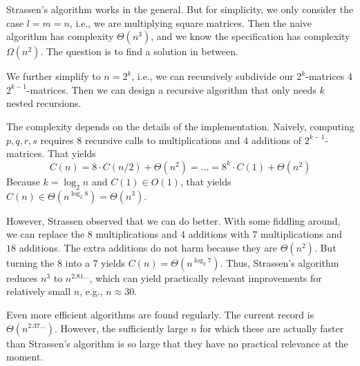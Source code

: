 Strassen's algorithm works in the general.
But for simplicity, we only consider the case $l=m=n$, i.e., we are multiplying square matrices.
Then the naive algorithm has complexity $\Theta(n^3)$, and we know the specification has complexity $\Omega(n^2)$.
The question is to find a solution in between.

We further simplify to $n=2^k$, i.e., we can recursively subdivide our $2^k$-matrices $4$ $2^{k-1}$-matrices.
Then we can design a recursive algorithm that only needs $k$ nested recursions.

The complexity depends on the details of the implementation.
Naively, computing $p,q,r,s$ requires $8$ recursive calls to multiplications and $4$ additions of $2^{k-1}$-matrices.
That yields
 \[C(n)=8\cdot C(n/2) + \Theta(n^2) = \ldots = 8^k\cdot C(1)+\Theta(n^2)\]
Because $k=\log_2 n$ and $C(1)\in O(1)$, that yields $C(n)\in\Theta(n^{\log_2 8})=\Theta(n^3)$.

However, Strassen observed that we can do better.
With some fiddling around, we can replace the $8$ multiplications and $4$ additions with $7$ multiplications and $18$ additions.
The extra additions do not harm because they are $\Theta(n^2)$.
But turning the $8$ into a $7$ yields $C(n)=\Theta(n^{\log_2 7})$.
Thus, Strassen's algorithm reduces $n^3$ to $n^{2.81\ldots}$, which can yield practically relevant improvements for relatively small $n$, e.g., $n\approx 30$.
\medskip

Even more efficient algorithms are found regularly.
The current record is $\Theta(n^{2.37\ldots})$.
However, the sufficiently large $n$ for which these are actually faster than Strassen's algorithm is so large that they have no practical relevance at the moment.

